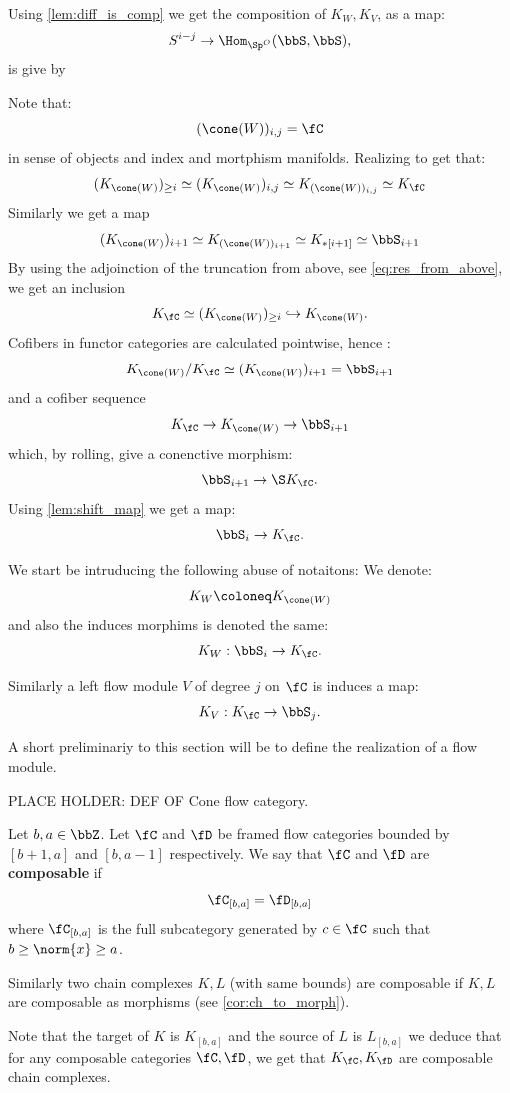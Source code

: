 Using \cref{lem:diff_is_comp} we get the composition of $K_W,K_V$, as a map:
\[
    S^{i-j} \to \Hom_{\Sp^O}(\bbS,\bbS),
\]
is give by 




Note that:
\[
    (\cone(W))_{i,j} = \fC
\]
in sense of objects and index and mortphism manifolds.
Realizing to get that:
\[
    (K_{\cone(W)})_{\geq i} \simeq (K_{\cone(W)})_{i,j} \simeq K_{(\cone(W))_{i,j}} \simeq K_{\fC}
\]
Similarly we get a map
\[
    (K_{\cone(W)})_{i+1} \simeq K_{(\cone(W))_{i+1}} \simeq K_{*[i+1]} \simeq \bbS_{i+1}
\]
By using the adjoinction of the truncation from above, see \cref{eq:res_from_above}, we get an inclusion
\[
    K_{\fC} \simeq (K_{\cone(W)})_{\geq i} \hookrightarrow K_{\cone(W)}.
\]
Cofibers in functor categories are calculated pointwise, hence :
\[
    K_{\cone(W)}/K_{\fC} \simeq (K_{\cone(W)})_{i+1} = \bbS_{i+1}
\]
and a cofiber sequence
\[
    K_{\fC} \to K_{\cone(W)} \to \bbS_{i+1}
\]
which, by rolling, give a conenctive morphism:
\[
    \bbS_{i+1} \to \S K_{\fC}. 
\]
Using \cref{lem:shift_map} we get a map:
\[
    \bbS_{i} \to K_{\fC}.
\]

We start be intruducing the following abuse of notaitons: 
We denote:
\[
    K_W \coloneq K_{\cone(W)}
\]
and also the induces morphims is denoted the same:
\[
    K_W : \bbS_{i} \to K_{\fC}.
\]

Similarly a left flow module $V$ of degree $j$ on $\fC$ is induces a map:
\[
    K_V : K_{\fC} \to \bbS_{j}.
\]


A short preliminariy to this section will be to define the realization of a flow module.

PLACE HOLDER: DEF OF Cone flow category.

\begin{defn}
    Let $b,a \in \bbZ$. Let $\fC$ and $\fD$ be framed flow categories bounded by $[b+1,a]$ and $[b,a-1]$ respectively. We say that $\fC$ and $\fD$ are \textbf{composable} if
    \begin{equation*}
        \fC_{[b,a]} = \fD_{[b,a]}
    \end{equation*}
    where $\fC_{[b,a]}$ is the full subcategory generated by $c \in \fC$ such that $b \geq \norm{x} \geq a$.

    Similarly two chain complexes $K,L$ (with same bounds) are composable if $K,L$ are composable as morphisms (see \cref{cor:ch_to_morph}).
\end{defn}

Note that the target of $K$ is $K_{[b,a]}$ and the source of $L$ is $L_{[b,a]}$ we deduce that for any composable categories $\fC,\fD$, we get that $K_{\fC},K_{\fD}$ are composable chain complexes.

